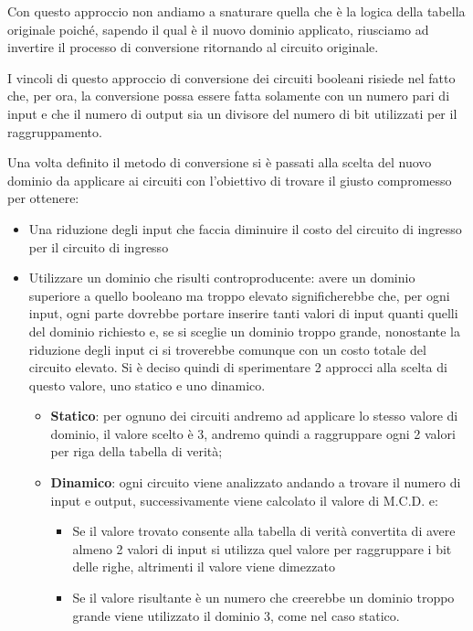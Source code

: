 \documentclass[
  italian,
]{book}
\providecommand{\tightlist}{%
  \setlength{\itemsep}{0pt}\setlength{\parskip}{0pt}}
\begin{document}
Con questo approccio non andiamo a snaturare quella che è la logica della tabella originale poiché, sapendo il qual è il nuovo dominio applicato, riusciamo ad invertire il processo di conversione ritornando al circuito originale.

I vincoli di questo approccio di conversione dei circuiti booleani risiede nel fatto che, per ora, la conversione possa essere fatta solamente con un numero pari di input e che il numero di output sia un divisore del numero di bit utilizzati per il raggruppamento.

\newpage

Una volta definito il metodo di conversione si è passati alla scelta del nuovo dominio da applicare ai circuiti con l'obiettivo di trovare il giusto compromesso per ottenere:

\begin{itemize}
\item
  Una riduzione degli input che faccia diminuire il costo del circuito di ingresso per il circuito di ingresso
\item
  Utilizzare un dominio che risulti controproducente: avere un dominio superiore a quello booleano ma troppo elevato significherebbe che, per ogni input, ogni parte dovrebbe portare inserire tanti valori di input quanti quelli del dominio richiesto e, se si sceglie un dominio troppo grande, nonostante la riduzione degli input ci si troverebbe comunque con un costo totale del circuito elevato. Si è deciso quindi di sperimentare 2 approcci alla scelta di questo valore, uno statico e uno dinamico.

  \begin{itemize}
  \tightlist
  \item
    \textbf{Statico}: per ognuno dei circuiti andremo ad applicare lo stesso valore di dominio, il valore scelto è 3, andremo quindi a raggruppare ogni 2 valori per riga della tabella di verità;
  \item
    \textbf{Dinamico}: ogni circuito viene analizzato andando a trovare il numero di input e output, successivamente viene calcolato il valore di M.C.D. e:

    \begin{itemize}
    \tightlist
    \item
      Se il valore trovato consente alla tabella di verità convertita di avere almeno 2 valori di input si utilizza quel valore per raggruppare i bit delle righe, altrimenti il valore viene dimezzato
    \item
      Se il valore risultante è un numero che creerebbe un dominio troppo grande viene utilizzato il dominio 3, come nel caso statico.
    \end{itemize}
  \end{itemize}
\end{itemize}
\end{document}
